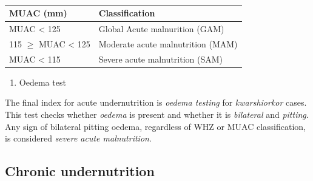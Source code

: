 \documentclass[12pt,]{book}
\providecommand{\tightlist}{%
  \setlength{\itemsep}{0pt}\setlength{\parskip}{0pt}}
\theoremstyle{definition}
\theoremstyle{definition}
\theoremstyle{definition}
\theoremstyle{remark}
\begin{document}
~

\begin{longtable}[]{@{}ll@{}}
\toprule
\begin{minipage}[b]{0.34\columnwidth}\raggedright
\textbf{MUAC (mm)}\strut
\end{minipage} & \begin{minipage}[b]{0.47\columnwidth}\raggedright
\textbf{Classification}\strut
\end{minipage}\tabularnewline
\midrule
\endhead
\begin{minipage}[t]{0.34\columnwidth}\raggedright
MUAC \textless{} 125\strut
\end{minipage} & \begin{minipage}[t]{0.47\columnwidth}\raggedright
Global Acute malnurition (GAM)\strut
\end{minipage}\tabularnewline
\begin{minipage}[t]{0.34\columnwidth}\raggedright
115 \(\geq\) MUAC \textless{} 125\strut
\end{minipage} & \begin{minipage}[t]{0.47\columnwidth}\raggedright
Moderate acute malnutrition (MAM)\strut
\end{minipage}\tabularnewline
\begin{minipage}[t]{0.34\columnwidth}\raggedright
MUAC \textless{} 115\strut
\end{minipage} & \begin{minipage}[t]{0.47\columnwidth}\raggedright
Severe acute malnutrition (SAM)\strut
\end{minipage}\tabularnewline
\bottomrule
\end{longtable}

\begin{enumerate}
\def\labelenumi{\arabic{enumi}.}
\setcounter{enumi}{2}
\tightlist
\item
  Oedema test
\end{enumerate}

The final index for acute undernutrition is \emph{oedema testing} for
\emph{kwarshiorkor} cases. This test checks whether \emph{oedema} is
present and whether it is \emph{bilateral} and \emph{pitting}. Any sign
of bilateral pitting oedema, regardless of WHZ or MUAC classification,
is considered \emph{severe acute malnutrition}.

\hypertarget{chronic-undernutrition}{%
\subsection{Chronic undernutrition}\label{chronic-undernutrition}}
\end{document}
